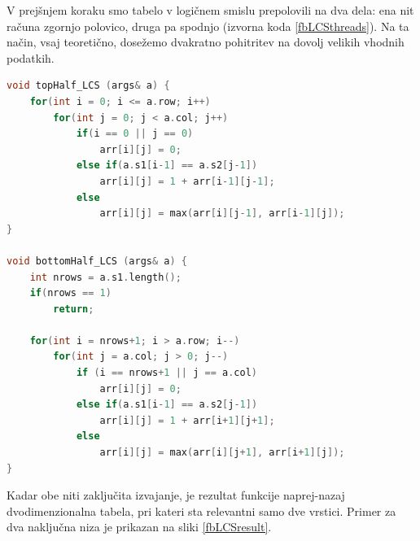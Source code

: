 \documentclass[a4paper,12pt,openright]{book}
\begin{document}
V prejšnjem koraku smo tabelo v logičnem smislu prepolovili na dva dela: ena nit računa zgornjo polovico, druga pa spodnjo (izvorna koda \ref{fbLCSthreads}). Na ta način, vsaj teoretično, dosežemo dvakratno pohitritev na dovolj velikih vhodnih podatkih. 

\bigskip
\begin{lstlisting}[language=C++, caption={Funkciji za računanje zgornje in spodnje polovice tabele za LCS.}, captionpos=b, label=fbLCSthreads]
void topHalf_LCS (args& a) {
    for(int i = 0; i <= a.row; i++) 
        for(int j = 0; j < a.col; j++)
            if(i == 0 || j == 0)
                arr[i][j] = 0;        
            else if(a.s1[i-1] == a.s2[j-1])
                arr[i][j] = 1 + arr[i-1][j-1];
            else 
                arr[i][j] = max(arr[i][j-1], arr[i-1][j]);
}

void bottomHalf_LCS (args& a) {
    int nrows = a.s1.length();
    if(nrows == 1)
        return;

    for(int i = nrows+1; i > a.row; i--) 
        for(int j = a.col; j > 0; j--) 
            if (i == nrows+1 || j == a.col) 
                arr[i][j] = 0;
            else if(a.s1[i-1] == a.s2[j-1])
                arr[i][j] = 1 + arr[i+1][j+1];
            else
                arr[i][j] = max(arr[i][j+1], arr[i+1][j]);
}
\end{lstlisting}

Kadar obe niti zaključita izvajanje, je rezultat funkcije naprej-nazaj dvodimenzionalna tabela, pri kateri sta relevantni samo dve vrstici. Primer za dva naključna niza je prikazan na sliki \ref{fbLCSresult}.
\end{document}
